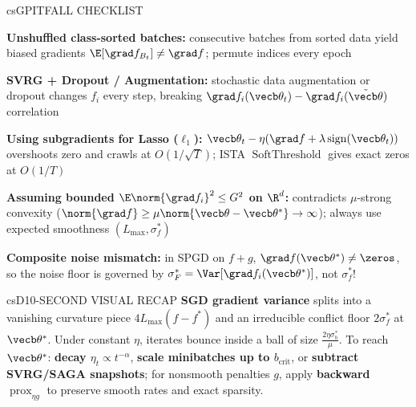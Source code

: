 \documentclass[../../../../master.tex]{subfiles}
\begin{document}
\begin{cscolumns}
\begin{cscard}{csG}{PITFALL CHECKLIST}
  \begin{csbul}
    \item \textbf{Unshuffled class-sorted batches:} consecutive batches from sorted data yield biased gradients $\E[\grad f_{B_t}]\neq\grad f$; permute indices every epoch
    \item \textbf{SVRG + Dropout / Augmentation:} stochastic data augmentation or dropout changes $f_i$ every step, breaking $\grad f_i(\vecb\theta_t)-\grad f_i(\tilde{\vecb\theta})$ correlation
    \item \textbf{Using subgradients for Lasso ($\ell_1$):} $\vecb\theta_t-\eta(\grad f+\lambda\operatorname{sign}(\vecb\theta_t))$ overshoots zero and crawls at $O(1/\sqrt T)$; ISTA $\operatorname{SoftThreshold}$ gives exact zeros at $O(1/T)$
    \item \textbf{Assuming bounded $\E\norm{\grad f_i}^2\le G^2$ on $\R^d$:} contradicts $\mu$-strong convexity ($\norm{\grad f}\ge\mu\norm{\vecb\theta-\vecb\theta^*}\to\infty$); always use expected smoothness $(L_{\max},\sigma_f^*)$
    \item \textbf{Composite noise mismatch:} in SPGD on $f+g$, $\grad f(\vecb\theta^*)\neq\zeros$, so the noise floor is governed by $\sigma_F^*=\Var[\grad f_i(\vecb\theta^*)]$, not $\sigma_f^*$!
  \end{csbul}
\end{cscard}

\begin{cscard}{csD}{10-SECOND VISUAL RECAP}
  \sffamily\footnotesize
  \textbf{SGD gradient variance} splits into a vanishing curvature piece $4L_{\max}(f-f^*)$ and an irreducible conflict floor $2\sigma_f^*$ at $\vecb\theta^*$.
  Under constant $\eta$, iterates bounce inside a ball of size $\frac{2\eta\sigma_b^*}{\mu}$.
  To reach $\vecb\theta^*$: \textbf{decay $\eta_t\propto t^{-\alpha}$}, \textbf{scale minibatches up to $b_{\mathrm{crit}}$}, or \textbf{subtract SVRG/SAGA snapshots}; for nonsmooth penalties $g$, apply \textbf{backward $\operatorname{prox}_{\eta g}$} to preserve smooth rates and exact sparsity.
\end{cscard}
\end{cscolumns}

\csend
\end{document}
